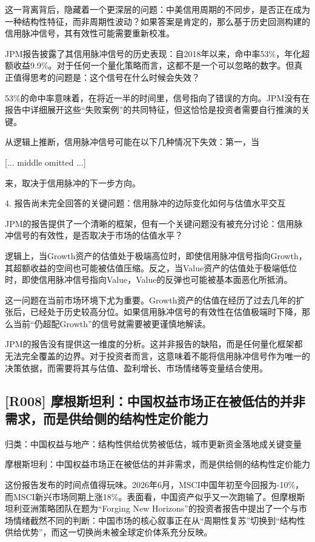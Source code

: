 \documentclass[11pt]{ctexart}
\begin{document}
这一背离背后，隐藏着一个更深层的问题：中美信用周期的不同步，是否正在成为一种结构性特征，而非周期性波动？如果答案是肯定的，那么基于历史回测构建的信用脉冲信号，其有效性可能需要重新校准。

JPM报告披露了其信用脉冲信号的历史表现：自2018年以来，命中率53\%，年化超额收益9.9\%。对于任何一个量化策略而言，这都不是一个可以忽略的数字。但真正值得思考的问题是：这个信号在什么时候会失效？

53\%的命中率意味着，在将近一半的时间里，信号指向了错误的方向。JPM没有在报告中详细展开这些“失败案例”的共同特征，但这恰恰是投资者需要自行推演的关键。

从逻辑上推断，信用脉冲信号可能在以下几种情况下失效：第一，当

[... middle omitted ...]

来，取决于信用脉冲的下一步方向。

4. 报告尚未完全回答的关键问题：信用脉冲的边际变化如何与估值水平交互

JPM的报告提供了一个清晰的框架，但有一个关键问题没有被充分讨论：信用脉冲信号的有效性，是否取决于市场的估值水平？

逻辑上，当Growth资产的估值处于极端高位时，即使信用脉冲信号指向Growth，其超额收益的空间也可能被估值压缩。反之，当Value资产的估值处于极端低位时，即使信用脉冲信号指向Value，Value的反弹也可能被基本面恶化所抵消。

这一问题在当前市场环境下尤为重要。Growth资产的估值在经历了过去几年的扩张后，已经处于历史较高分位。如果信用脉冲信号的有效性在估值极端时下降，那么当前“仍超配Growth”的信号就需要被更谨慎地解读。

JPM的报告没有提供这一维度的分析。这并非报告的缺陷，而是任何量化框架都无法完全覆盖的边界。对于投资者而言，这意味着不能将信用脉冲信号作为唯一的决策依据，而需要将其与估值、盈利增长、市场情绪等变量结合使用。

\subsection{[R008] 摩根斯坦利：中国权益市场正在被低估的并非需求，而是供给侧的结构性定价能力}
{\small\color{refgray}归类：中国权益与地产：结构性供给优势被低估，城市更新资金落地成关键变量}

摩根斯坦利：中国权益市场正在被低估的并非需求，而是供给侧的结构性定价能力

这份报告发布的时间点值得玩味。2026年6月，MSCI中国年初至今回报为-10\%，而MSCI新兴市场同期上涨18\%。表面看，中国资产似乎又一次跑输了。但摩根斯坦利亚洲策略团队在题为“Forging New Horizons”的投资者报告中提出了一个与市场情绪截然不同的判断：中国市场的核心叙事正在从“周期性复苏”切换到“结构性供给优势”，而这一切换尚未被全球定价体系充分反映。
\end{document}
